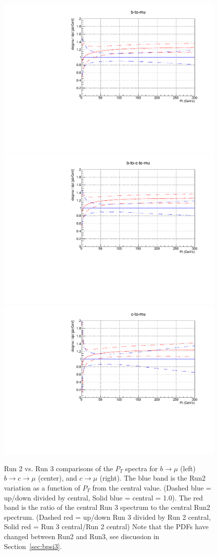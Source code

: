 \documentclass[12pt]{article}
\begin{document}
\begin{figure}[H]
\includegraphics[width=0.31\linewidth]{../muons/data/b-to-mu_Run2_Run3_comparison.pdf}
\includegraphics[width=0.31\linewidth]{../muons/data/b-to-c-to-mu_Run2_Run3_comparison.pdf}
\includegraphics[width=0.31\linewidth]{../muons/data/c-to-mu_Run2_Run3_comparison.pdf}
\caption{Run 2 vs. Run 3 comparisons of the $P_T$ spectra for $b \to \mu$ (left)
    $b \to c \to \mu$ (center), and $c \to \mu$ (right).
      The blue band is the Run2 variation as a function of $P_T$ from the central value.
(Dashed blue = up/down divided by central, Solid blue = central = 1.0).
The red band is the ratio of the central Run 3 spectrum to the central Run2 spectrum.
(Dashed red = up/down Run 3 divided by Run 2 central, Solid red = Run 3 central/Run 2 central)
Note that the PDFs have changed between Run2 and Run3, see discussion
in Section~\ref{sec:bpsi3}.}
  \label{fig:bmuon23}
\end{figure}


\clearpage
\end{document}
